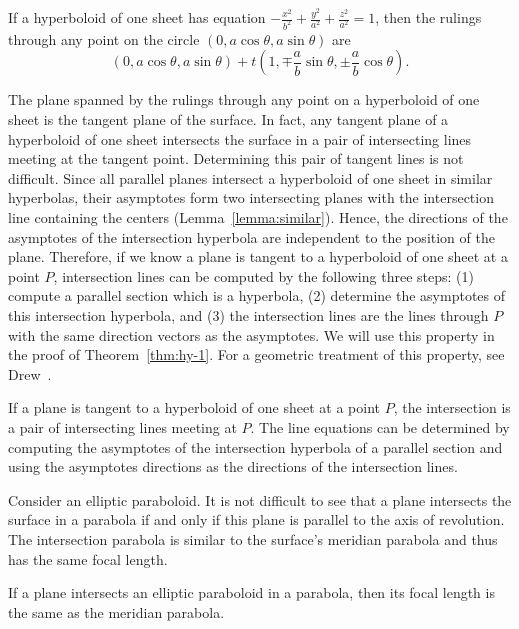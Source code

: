 \begin{lemma}
\label{lemma:rulings}
     If a hyperboloid of one sheet has equation $-\frac{x^2}{b^2}+
\frac{y^2}{a^2}+\frac{z^2}{a^2}=1$, then the rulings through any point 
on the circle $(0,a\cos\!\theta,a\sin\!\theta)$ are
\[ (0,a\cos\theta,a\sin\theta)+
     t\left(1,\mp\frac{a}{b}\sin\theta,\pm\frac{a}{b}\cos\theta\right). \]
\end{lemma}

     The plane spanned by the rulings through any point on a hyperboloid of
one sheet is the tangent plane of the surface.  In fact, any tangent
plane of a hyperboloid of one sheet intersects the surface in a pair of
intersecting lines meeting at the tangent point.  Determining this pair
of tangent lines is not difficult.  Since all parallel planes intersect a 
hyperboloid of one sheet in similar hyperbolas, their asymptotes form two 
intersecting planes with the intersection line  containing the centers
(Lemma~\ref{lemma:similar}).  
Hence, the directions of the asymptotes of the intersection hyperbola are 
independent to the position of the plane.  Therefore, if we know a plane is 
tangent to a hyperboloid of one sheet at a point $P$, intersection lines 
can be computed by the following three steps:
(1) compute a parallel section which is a hyperbola,
(2) determine the asymptotes of this intersection hyperbola, and
(3) the intersection lines are the lines through $P$ with the same direction 
vectors as the asymptotes.
We will use this property in the proof of Theorem~\ref{thm:hy-1}.
For a geometric treatment of this property, see 
Drew~\cite[page 119]{drew:1875}.

\begin{lemma}
\label{lemma:asymptotes}
     If a plane is tangent to a hyperboloid of one sheet at a point $P$, the
intersection is a pair of intersecting lines meeting at $P$. The line equations
can be determined by computing the asymptotes of the intersection hyperbola of 
a parallel section and using the asymptotes directions as the directions of
the intersection lines.
\end{lemma}

     Consider an elliptic paraboloid.  It is not difficult to see that a plane
intersects the surface in a parabola if and only if this plane is parallel to 
the axis of revolution.  The intersection parabola is similar to the surface's
meridian parabola and thus has the same focal length.

\begin{lemma}
\label{lemma:parabola-focal-length}
     If a plane intersects an elliptic paraboloid in a parabola, then its 
focal length is the same as the meridian parabola.
\end{lemma}

